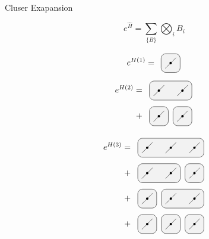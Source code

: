 
\begin{frame}{Cluser Exapansion}

     {
        \begin{equation}
            e^{ \hat{H} } = \sum_{ \{B\} }  \bigotimes_i B_i
        \end{equation}
    }

    \begin{minipage}{0.5\textwidth}

         {
            \begin{equation}
                e^{H(1)} =  \vcenter{ \hbox{ \paa  }}
            \end{equation}
            \begin{equation}
                \begin{split}
                    e^{H(2)} =&  \vcenter{ \hbox{ \pa }} \\
                    +&  \vcenter{ \hbox{ \pb }}
                \end{split}
            \end{equation}

        }

         { \clustFullA }
    \end{minipage}
    \begin{minipage}{0.49\textwidth}

         {

            \begin{equation}
                \begin{split}
                    e^{H(3) } =&  \vcenter{ \hbox{ \pcc }} \\
                    +&  \vcenter{ \hbox{ \pca }} \\
                    +&  \vcenter{ \hbox{ \pcb }} \\
                    +&  \vcenter{ \hbox{ \pc }}
                \end{split}
            \end{equation}
        }


\end{minipage}
\end{frame}
